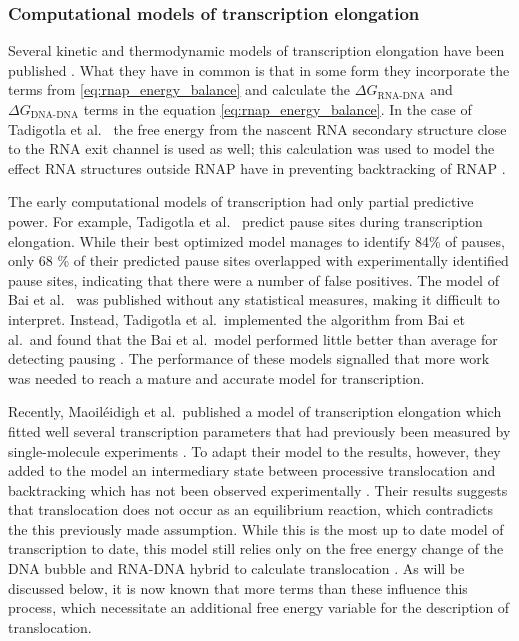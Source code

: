 \subsubsection{Computational models of transcription elongation}
Several kinetic and thermodynamic models of transcription elongation have been
published \cite{tadigotla_thermodynamic_2006, bai_sequence-dependent_2004,
guajardo_model_1997, yager_thermodynamic_1991}. What they have in common is
that in some form they incorporate the terms from
\eqref{eq:rnap_energy_balance} and calculate the $\Delta G_{\text{RNA-DNA}}$
and $\Delta G_{\text{DNA-DNA}}$ terms in the equation
\eqref{eq:rnap_energy_balance}. In the case of Tadigotla et al.\
\cite{tadigotla_thermodynamic_2006} the free energy from the nascent RNA
secondary structure close to the RNA exit channel is used as well; this
calculation was used to model the effect RNA structures outside RNAP have in
preventing backtracking of RNAP \cite{zamft_nascent_2012}.

The early computational models of transcription had only partial predictive
power. For example, Tadigotla et al.\ \cite{tadigotla_thermodynamic_2006}
predict pause sites during transcription elongation. While their best optimized
model manages to identify 84\% of pauses, only 68 \% of their predicted pause
sites overlapped with experimentally identified pause sites, indicating that
there were a number of false positives. The model of Bai et al.\
\cite{bai_mechanochemical_2007} was published without any statistical measures,
making it difficult to interpret. Instead, Tadigotla et al.\ implemented the
algorithm from Bai et al.\ and found that the Bai et al.\ model performed
little better than average for detecting pausing
\cite{tadigotla_thermodynamic_2006}. The performance of these models signalled
that more work was needed to reach a mature and accurate model for
transcription.

Recently, Maoiléidigh et al.\ published a model of transcription elongation
which fitted well several transcription parameters that had previously been
measured by single-molecule experiments \cite{o_maoileidigh_unified_2011}. To
adapt their model to the results, however, they added to the model an
intermediary state between processive translocation and backtracking which has
not been observed experimentally \cite{o_maoileidigh_unified_2011}. Their
results suggests that translocation does not occur as an equilibrium reaction,
which contradicts the this previously made assumption. While this is the most
up to date model of transcription to date, this model still relies only on the
free energy change of the DNA bubble and RNA-DNA hybrid to calculate
translocation \cite{o_maoileidigh_unified_2011}. As will be discussed below, it
is now known that more terms than these influence this process, which
necessitate an additional free energy variable for the description of
translocation.


